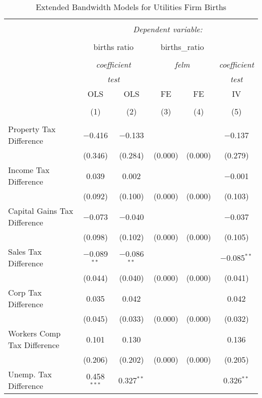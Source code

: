 
\begin{table}[!htbp] \centering 
  \caption{Extended Bandwidth Models for  Utilities Firm Births} 
  \label{} 
\begin{tabular}{@{\extracolsep{5pt}}lccccc} 
\\[-1.8ex]\hline 
\hline \\[-1.8ex] 
 & \multicolumn{5}{c}{\textit{Dependent variable:}} \\ 
\cline{2-6} 
\\[-1.8ex] & \multicolumn{2}{c}{births ratio} & \multicolumn{2}{c}{births\_ratio} &   \\ 
\\[-1.8ex] & \multicolumn{2}{c}{\textit{coefficient}} & \multicolumn{2}{c}{\textit{felm}} & \textit{coefficient} \\ 
 & \multicolumn{2}{c}{\textit{test}} & \multicolumn{2}{c}{\textit{}} & \textit{test} \\ 
 & OLS & OLS & FE & FE & IV \\ 
\\[-1.8ex] & (1) & (2) & (3) & (4) & (5)\\ 
\hline \\[-1.8ex] 
 Property Tax Difference & $-$0.416 & $-$0.133 &  &  & $-$0.137 \\ 
  & (0.346) & (0.284) & (0.000) & (0.000) & (0.279) \\ 
  Income Tax Difference & 0.039 & 0.002 &  &  & $-$0.001 \\ 
  & (0.092) & (0.100) & (0.000) & (0.000) & (0.103) \\ 
  Capital Gains Tax Difference & $-$0.073 & $-$0.040 &  &  & $-$0.037 \\ 
  & (0.098) & (0.102) & (0.000) & (0.000) & (0.105) \\ 
  Sales Tax Difference & $-$0.089$^{**}$ & $-$0.086$^{**}$ &  &  & $-$0.085$^{**}$ \\ 
  & (0.044) & (0.040) & (0.000) & (0.000) & (0.041) \\ 
  Corp Tax Difference & 0.035 & 0.042 &  &  & 0.042 \\ 
  & (0.045) & (0.033) & (0.000) & (0.000) & (0.032) \\ 
  Workers Comp Tax Difference & 0.101 & 0.130 &  &  & 0.136 \\ 
  & (0.206) & (0.202) & (0.000) & (0.000) & (0.205) \\ 
  Unemp. Tax Difference & 0.458$^{***}$ & 0.327$^{**}$ &  &  & 0.326$^{**}$ \\ 

\end{tabular}
\end{table}
